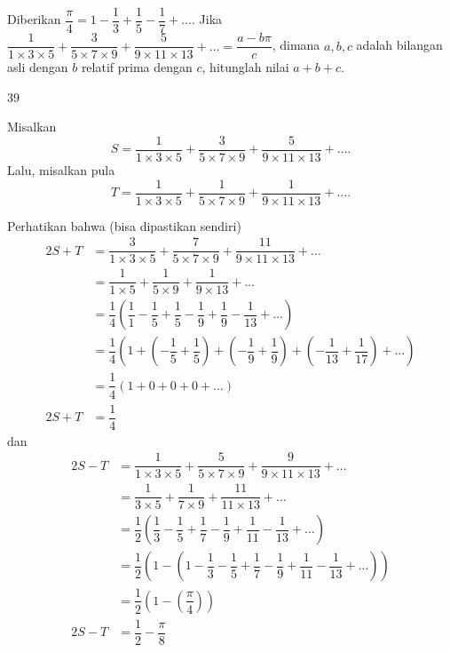 \documentclass[11pt]{scrartcl}
\begin{document}
	\begin{soalbaru}
			Diberikan $\dfrac{\pi}{4} = 1 - \dfrac{1}{3}+\dfrac{1}{5}-\dfrac{1}{7}+\dots$. Jika  $\dfrac{1}{1 \times 3 \times 5}+\dfrac{3}{5 \times 7 \times 9}+\dfrac{5}{9 \times 11 \times 13}+\dots = \dfrac{a-b\pi}{c}$, dimana $a,b,c$ adalah bilangan asli dengan $b$ relatif prima dengan $c$, hitunglah nilai $a+b+c$.
			
			\begin{jawaban}
			39
			\end{jawaban}
			\begin{solusi}
			Misalkan $$S=\dfrac{1}{1 \times 3 \times 5}+\dfrac{3}{5 \times 7 \times 9}+\dfrac{5}{9 \times 11 \times 13}+\dots.$$ 
			Lalu, misalkan pula $$T=\dfrac{1}{1 \times 3 \times 5}+\dfrac{1}{5 \times 7 \times 9}+\dfrac{1}{9 \times 11 \times 13}+\dots.$$
			
			Perhatikan bahwa (bisa dipastikan sendiri) 
			\begin{equation*}
			\begin{split}
			2S+T &= \dfrac{3}{1 \times 3 \times 5}+\dfrac{7}{5 \times 7 \times 9}+\dfrac{11}{9 \times 11 \times 13}+\dots\\
			&=\dfrac{1}{1 \times 5}+\dfrac{1}{5 \times 9}+\dfrac{1}{9 \times 13}+\dots\\
			&=\dfrac{1}{4}\left(\dfrac{1}{1}-\dfrac{1}{5}+\dfrac{1}{5}-\dfrac{1}{9}+\dfrac{1}{9}-\dfrac{1}{13}+\dots\right)\\
			&=\dfrac{1}{4}\left(1+\left(-\dfrac{1}{5}+\dfrac{1}{5}\right)+\left(-\dfrac{1}{9}+\dfrac{1}{9}\right)+\left(-\dfrac{1}{13}+\dfrac{1}{17}\right)+\dots\right)\\
			&=\dfrac{1}{4}\left(1+0+0+0+\dots\right)\\
			2S+T&=\dfrac{1}{4}
			\end{split}
			\end{equation*}
			dan
			\begin{equation*}
			\begin{split}
			2S-T&= \dfrac{1}{1 \times 3 \times 5}+\dfrac{5}{5 \times 7 \times 9}+\dfrac{9}{9 \times 11 \times 13}+\dots\\
				&=\dfrac{1}{3 \times 5}+\dfrac{1}{7 \times 9}+\dfrac{11}{11 \times 13}+\dots\\
				&=\dfrac{1}{2}\left(\dfrac{1}{3}-\dfrac{1}{5}+\dfrac{1}{7}-\dfrac{1}{9}+\dfrac{1}{11}-\dfrac{1}{13}+\dots\right)\\
				&=\dfrac{1}{2}\left(1-\left(1-\dfrac{1}{3}-\dfrac{1}{5}+\dfrac{1}{7}-\dfrac{1}{9}+\dfrac{1}{11}-\dfrac{1}{13}+\dots\right)\right)\\
				&=\dfrac{1}{2}\left(1-\left(\dfrac{\pi}{4}\right)\right)\\
			2S-T&=\dfrac{1}{2}-\dfrac{\pi}{8}
			\end{split}
			\end{equation*}
			

\end{solusi}
\end{soalbaru}
\end{document}
